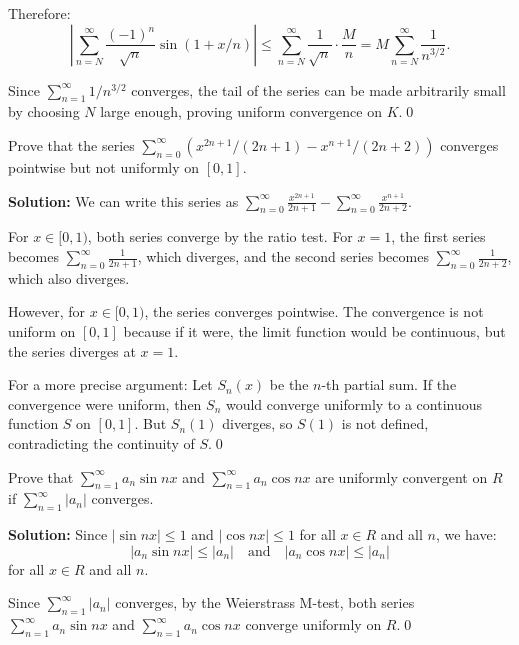 Therefore:
\[\left|\sum_{n=N}^{\infty} \frac{(-1)^n}{\sqrt{n}} \sin(1 + x/n)\right| \leq \sum_{n=N}^{\infty} \frac{1}{\sqrt{n}} \cdot \frac{M}{n} = M \sum_{n=N}^{\infty} \frac{1}{n^{3/2}}.\]

Since \( \sum_{n=1}^{\infty} 1/n^{3/2} \) converges, the tail of the series can be made arbitrarily small by choosing \( N \) large enough, proving uniform convergence on \( K \).\qed


\begin{problembox}
Prove that the series \(\sum_{n=0}^{\infty} (x^{2n+1}/(2n + 1) - x^{n+1}/(2n + 2))\) converges pointwise but not uniformly on \([0, 1]\).
\end{problembox}

\bigskip\noindent\textbf{Solution:} We can write this series as \( \sum_{n=0}^{\infty} \frac{x^{2n+1}}{2n + 1} - \sum_{n=0}^{\infty} \frac{x^{n+1}}{2n + 2} \).

For \( x \in [0, 1) \), both series converge by the ratio test. For \( x = 1 \), the first series becomes \( \sum_{n=0}^{\infty} \frac{1}{2n + 1} \), which diverges, and the second series becomes \( \sum_{n=0}^{\infty} \frac{1}{2n + 2} \), which also diverges.

However, for \( x \in [0, 1) \), the series converges pointwise. The convergence is not uniform on \([0, 1]\) because if it were, the limit function would be continuous, but the series diverges at \( x = 1 \).

For a more precise argument: Let \( S_n(x) \) be the \( n \)-th partial sum. If the convergence were uniform, then \( S_n \) would converge uniformly to a continuous function \( S \) on \([0, 1]\). But \( S_n(1) \) diverges, so \( S(1) \) is not defined, contradicting the continuity of \( S \).\qed


\begin{problembox}
Prove that \(\sum_{n=1}^{\infty} a_n \sin nx \) and \(\sum_{n=1}^{\infty} a_n \cos nx \) are uniformly convergent on \( R \) if \(\sum_{n=1}^{\infty} |a_n| \) converges.
\end{problembox}

\bigskip\noindent\textbf{Solution:} Since \( |\sin nx| \leq 1 \) and \( |\cos nx| \leq 1 \) for all \( x \in R \) and all \( n \), we have:
\[|a_n \sin nx| \leq |a_n| \quad \text{and} \quad |a_n \cos nx| \leq |a_n|\]
for all \( x \in R \) and all \( n \).

Since \( \sum_{n=1}^{\infty} |a_n| \) converges, by the Weierstrass M-test, both series \( \sum_{n=1}^{\infty} a_n \sin nx \) and \( \sum_{n=1}^{\infty} a_n \cos nx \) converge uniformly on \( R \).\qed


